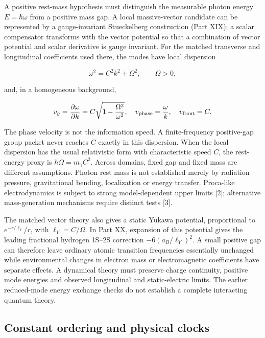 \documentclass[
  11pt,
  twoside]{article}
\begin{document}
A positive rest-mass hypothesis must distinguish the measurable photon
energy \(E=\hbar\omega\) from a positive mass gap. A local
massive-vector candidate can be represented by a gauge-invariant
Stueckelberg construction (Part XIX); a scalar compensator transforms
with the vector potential so that a combination of vector potential and
scalar derivative is gauge invariant. For the matched transverse and
longitudinal coefficients used there, the modes have local dispersion

\[\omega^2=C^2 k^2+\Omega^2,\qquad \Omega>0,\]

and, in a homogeneous background,

\[v_g=\frac{\partial\omega}{\partial k}=C\sqrt{1-\frac{\Omega^2}{\omega^2}},\quad v_{\rm phase}=\frac{\omega}{k},\quad v_{\rm front}=C.\]

The phase velocity is not the information speed. A finite-frequency
positive-gap group packet never reaches \(C\) exactly in this
dispersion. When the local dispersion has the usual relativistic form
with characteristic speed \(C\), the rest-energy proxy is
\(\hbar\Omega=m_\gamma C^2\). Across domains, fixed gap and fixed mass
are different assumptions. Photon rest mass is not established merely by
radiation pressure, gravitational bending, localization or energy
transfer. Proca-like electrodynamics is subject to strong
model-dependent upper limits {[}2{]}; alternative mass-generation
mechanisms require distinct tests {[}3{]}.

The matched vector theory also gives a static Yukawa potential,
proportional to \(e^{-r/\ell_Y}/r\), with \(\ell_Y=C/\Omega\). In Part
XX, expansion of this potential gives the leading fractional hydrogen
1S--2S correction \(-6(a_B/\ell_Y)^2\). A small positive gap can
therefore leave ordinary atomic transition frequencies essentially
unchanged while environmental changes in electron mass or
electromagnetic coefficients have separate effects. A dynamical theory
must preserve charge continuity, positive mode energies and observed
longitudinal and static-electric limits. The earlier reduced-mode energy
exchange checks do not establish a complete interacting quantum theory.

\subsection{Constant ordering and physical
clocks}\label{constant-ordering-and-physical-clocks}
\end{document}
